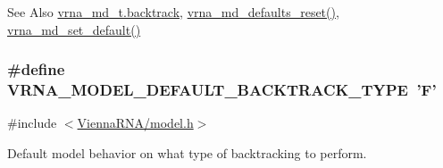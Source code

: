 \begin{DoxySeeAlso}{See Also}
\hyperlink{group__model__details_a31f4471608cbdd03887f63c281823adb}{vrna\-\_\-md\-\_\-t.\-backtrack}, \hyperlink{group__model__details_ga70834424cf804d149937de89f80ceb45}{vrna\-\_\-md\-\_\-defaults\-\_\-reset()}, \hyperlink{group__model__details_ga8ac6ff84936282436f822644bf841f66}{vrna\-\_\-md\-\_\-set\-\_\-default()} 
\end{DoxySeeAlso}
\hypertarget{group__model__details_gad0e81fcaca53c4a826c68e0796de2afb}{
\subsubsection[{V\-R\-N\-A\-\_\-\-M\-O\-D\-E\-L\-\_\-\-D\-E\-F\-A\-U\-L\-T\-\_\-\-B\-A\-C\-K\-T\-R\-A\-C\-K\-\_\-\-T\-Y\-P\-E}]{\setlength{\rightskip}{0pt plus 5cm}\#define V\-R\-N\-A\-\_\-\-M\-O\-D\-E\-L\-\_\-\-D\-E\-F\-A\-U\-L\-T\-\_\-\-B\-A\-C\-K\-T\-R\-A\-C\-K\-\_\-\-T\-Y\-P\-E~'F'}}\label{group__model__details_gad0e81fcaca53c4a826c68e0796de2afb}


{\ttfamily \#include $<$\hyperlink{model_8h}{Vienna\-R\-N\-A/model.\-h}$>$}



Default model behavior on what type of backtracking to perform. 

